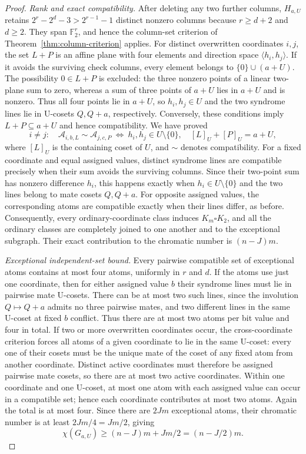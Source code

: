 \documentclass[11pt,a4paper]{article}
\begin{document}
\begin{proof}
\emph{Rank and exact compatibility.}
After deleting any two further columns, $H_{a,U}$ retains
$2^r-2^d-3>2^{r-1}-1$ distinct nonzero columns because
$r\ge d+2$ and $d\ge2$. They span $\mathbb F_2^r$, and hence the
column-set criterion of Theorem~\ref{thm:column-criterion} applies.
For distinct overwritten coordinates $i,j$, the set $L+P$ is an affine
plane with four elements and direction space $\langle h_i,h_j\rangle$.
If it avoids the surviving check columns, every element belongs to
$\{0\}\cup(a+U)$. The possibility $0\in L+P$ is excluded: the three
nonzero points of a linear two-plane sum to zero, whereas a sum of three
points of $a+U$ lies in $a+U$ and is nonzero. Thus all four points lie in
$a+U$, so $h_i,h_j\in U$ and the two syndrome lines lie in U-cosets
$Q,Q+a$, respectively. Conversely, these conditions imply
$L+P\subseteq a+U$ and hence compatibility. We have proved
\begin{equation}\label{eq:hierarchy-cross}
 i\ne j:\quad \mathcal A_{i,b,L}\sim\mathcal A_{j,c,P}
 \ \Longleftrightarrow\ h_i,h_j\in U\setminus\{0\},\quad
 [L]_U+[P]_U=a+U,
\end{equation}
where $[L]_U$ is the containing coset of $U$, and $\sim$ denotes
compatibility.
For a fixed coordinate and equal assigned values, distinct syndrome lines
are compatible precisely when their sum avoids the surviving columns.
Since their two-point sum has nonzero difference $h_i$, this happens
exactly when $h_i\in U\setminus\{0\}$ and the two lines belong to mate
cosets $Q,Q+a$. For opposite assigned values, the corresponding atoms
are compatible exactly when their lines differ, as before.
Consequently, every ordinary-coordinate class induces
$K_m\square K_2$, and all the ordinary classes are completely joined to
one another and to the exceptional subgraph. Their exact contribution to
the chromatic number is $(n-J)m$.

\emph{Exceptional independent-set bound.}
Every pairwise compatible set of exceptional atoms contains
at most four atoms, uniformly in $r$ and $d$. If the atoms use just one
coordinate, then for either assigned value $b$ their syndrome lines must
lie in pairwise mate U-cosets. There can be at most two such lines, since
the involution $Q\mapsto Q+a$ admits no three pairwise mates, and two
different lines in the same U-coset at fixed $b$ conflict. Thus there
are at most two atoms per bit value and four in total.
If two or more overwritten coordinates occur, the cross-coordinate
criterion forces all atoms of a given coordinate to lie in the same
U-coset: every one of their cosets must be the unique mate of the coset
of any fixed atom from another coordinate. Distinct active coordinates
must therefore be assigned pairwise mate cosets, so there are at most two
active coordinates. Within one coordinate and one U-coset, at most one
atom with each assigned value can occur in a compatible set; hence each
coordinate contributes at most two atoms. Again the total is at most
four. Since there are $2Jm$ exceptional atoms, their chromatic number is
at least $2Jm/4=Jm/2$, giving
\[
 \chi(G_{a,U})\ge (n-J)m+Jm/2=(n-J/2)m.
\]


\end{proof}
\end{document}

